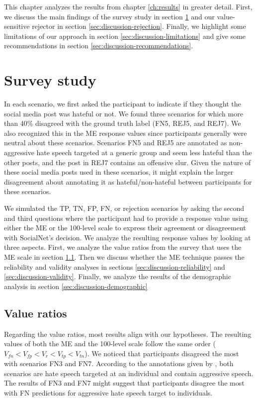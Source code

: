 %
This chapter analyzes the results from chapter \ref{ch:results} in greater detail.
%
First, we discuss the main findings of the survey study in section \ref{sec:discussion-survey} and our value-sensitive rejector in section \ref{sec:discussion-rejection}.
%
Finally, we highlight some limitations of our approach in section \ref{sec:discussion-limitations} and give some recommendations in section \ref{sec:discussion-recommendations}.


\section{Survey study}
\label{sec:discussion-survey}
%
In each scenario, we first asked the participant to indicate if they thought the social media post was hateful or not.
%
We found three scenarios for which more than 40\% disagreed with the ground truth label (FN5, REJ5, and REJ7).
%
We also recognized this in the ME response values since participants generally were neutral about these scenarios.
%
Scenarios FN5 and REJ5 are annotated as non-aggressive hate speech targeted at a generic group and seem less hateful than the other posts, and the post in REJ7 contains an offensive slur.
%
Given the nature of these social media posts used in these scenarios, it might explain the larger disagreement about annotating it as hateful/non-hateful between participants for these scenarios.
%

%
We simulated the TP, TN, FP, FN, or rejection scenarios by asking the second and third questions where the participant had to provide a response value using either the ME or the 100-level scale to express their agreement or disagreement with SocialNet's decision.
%
We analyze the resulting response values by looking at three aspects.
%
First, we analyze the value ratios from the survey that uses the ME scale in section \ref{sec:discussion-value-ratios}.
%
Then we discuss whether the ME technique passes the reliability and validity analyses in sections \ref{sec:discussion-reliability} and \ref{sec:discussion-validity}.
%
Finally, we analyze the results of the demographic analysis in section \ref{sec:discussion-demographic}


\subsection{Value ratios}
\label{sec:discussion-value-ratios}
%
Regarding the value ratios, most results align with our hypotheses.
%
The resulting values of both the ME and the 100-level scale follow the same order ($V_{fn} < V_{fp} < V_{r} < V_{tp} < V_{tn}$).
%
We noticed that participants disagreed the most with scenarios FN3 and FN7.
%
According to the annotations given by \citet{basile2019semeval}, both scenarios are hate speech targeted at an individual and contain aggressive speech.
%
The results of FN3 and FN7 might suggest that participants disagree the most with FN predictions for aggressive hate speech target to individuals.
%

